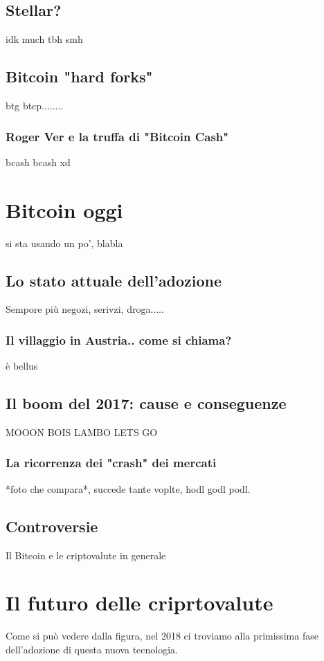 \documentclass {article}
\begin{document}
\subsection {Stellar?}

idk much tbh smh

\subsection {Bitcoin "hard forks"}

btg btcp........

\subsubsection {Roger Ver e la truffa di "Bitcoin Cash"}

bcash bcash xd

\section {Bitcoin oggi}

si sta usando un po', blabla

\subsection {Lo stato attuale dell'adozione}

Sempore più negozi, serivzi, droga.....

\subsubsection {Il villaggio in Austria.. come si chiama?}

è bellus

\subsection {Il boom del 2017: cause e conseguenze}

MOOON BOIS LAMBO LETS GO

\subsubsection {La ricorrenza dei "crash" dei mercati}

*foto che compara*, succede tante voplte, hodl godl podl.

\subsection {Controversie}

Il Bitcoin e le criptovalute in generale

\section {Il futuro delle criprtovalute}

Come si può vedere dalla figura, nel 2018 ci troviamo alla primissima fase dell'adozione di questa nuova tecnologia.
\end{document}
